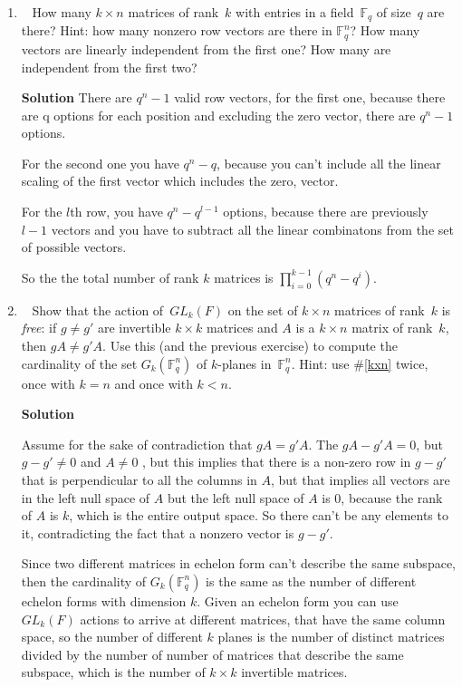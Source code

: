 \documentclass[11pt]{article}
\newcommand\score[1]{\marginpar{\vspace{-2ex}\color{blue}{#1/3}}\hspace{-1ex}}
\newcommand\0{\mathbf{0}}
\newcommand\FF{\mathbb{F}}
\newcommand\GL{\mathit{GL}}
\newcommand\<{\langle}
\renewcommand\>{\rangle}
\begin{document}
\begin{enumerate}
\pagebreak


\item\ \score{}\label{kxn}%
How many $k \times n$ matrices of rank~$k$ with entries in a
field~$\FF_q$ of size~$q$ are there?  Hint: how many nonzero row
vectors are there in $\FF_q^n$?  How many vectors are linearly
independent from the first one?  How many are independent from the
first two?

\textbf{Solution}
There are $q^n-1$ valid row vectors, for the first one, because there are q options for each position
and excluding the zero vector, there are $q^n-1$ options.

For the second one you have $q^n-q$, because you can't include all the linear scaling of the first vector
which includes the zero, vector. 

For the $l$th row, you have $q^n - q^{l-1}$ options, because there are previously $l-1$ vectors
and you have to subtract all the linear combinatons from the set of possible vectors.

So the the total number of rank $k$ matrices is $\prod_{i=0}^{k-1} (q^n - q^i)$.

\pagebreak


\item\ \score{}\label{free}%
Show that the action of~$\GL_k(F)$ on the set of $k \times n$ matrices
of rank~$k$ is \emph{free}: if $g \neq g'$ are invertible $k \times k$
matrices and $A$ is a $k \times n$ matrix of rank~$k$, then $gA \neq
g'A$.  Use this (and the previous exercise) to compute the cardinality
of the set $G_k(\FF_q^n)$ of $k$-planes in~$\FF_q^n$.  Hint: use
\#\ref{kxn} twice, once with $k = n$ and once with $k < n$.

\textbf{Solution}

Assume for the sake of contradiction that $gA=g'A$. The $gA-g'A=0$, but $g-g' \neq 0$ and $A\neq 0$
, but this implies that there is a non-zero row in $g-g'$ that is perpendicular to all 
the columns in $A$, but that implies all vectors are in the left null space of $A$
but the left null space of $A$ is 0, because the rank of $A$ is $k$, which is the entire output space.
So there can't be any elements to it, contradicting the fact that a nonzero vector is $g-g'$.

Since two different matrices in echelon form can't describe the same subspace, then the cardinality of
$G_k(\FF_q^n)$ is the same as the number of different echelon forms with dimension $k$. Given an echelon form you
can use $GL_k(F)$ actions to arrive at different matrices, that have the same column space, so 
the number of different $k$ planes is the number of distinct matrices divided by the number of 
number of matrices that describe the same subspace, which is the number of $k \times k$ invertible matrices.


\end{enumerate}
\end{document}
